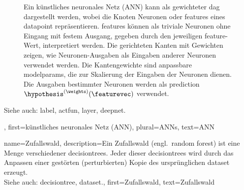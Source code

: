 {{{{{{\begin{figure}[H]
 			\caption{Ein künstliches neuronales Netz (ANN) kann als gewichteter \gls{dag} dargestellt werden, 
			wobei die Knoten Neuronen oder \glspl{feature} eines \gls{datapoint} repräsentieren. 
			\Glspl{feature} können als triviale Neuronen ohne Eingang mit festem Ausgang, 
			gegeben durch den jeweiligen \gls{feature}-Wert, interpretiert werden. 
			Die gerichteten Kanten mit Gewichten zeigen, wie Neuronen-Ausgaben als Eingaben 
			anderer Neuronen verwendet werden. Die Kantengewichte sind anpassbare \glspl{modelparam}, 
			die zur Skalierung der Eingaben der Neuronen dienen. Die Ausgaben bestimmter Neuronen 
			werden als \gls{prediction} $\hypothesis^{(\weights)}(\featurevec)$ verwendet.}
 			\label{fig_ANN_DAG_dict}
 			\end{figure}
		Siehe auch: \gls{label}, \gls{actfun}, \gls{layer}, \gls{deepnet}.},
	first={künstliches neuronales Netz (ANN)},
	plural={ANNs},
	text={ANN}
}

{name={Zufallswald},
	description={Ein Zufallswald (engl.~random forest) ist eine Menge verschiedener \glspl{decisiontree}. 
		Jeder dieser \glspl{decisiontree} wird durch das Anpassen einer gestörten (perturbierten) Kopie 
		des ursprünglichen \gls{dataset} erzeugt.
				\\
		Siehe auch: \gls{decisiontree}, \gls{dataset}.},
	first={Zufallswald}, 
	text={Zufallswald}
}

}}}}
